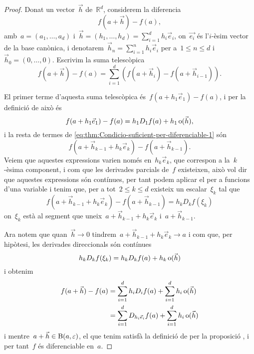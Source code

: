 \documentclass[../calcul-en-diverses-variables.tex]{subfiles}
\begin{document}
    \begin{proof}
        Donat un vector~\(\vec{h}\) de~\(\mathbb{R}^{d}\), considerem la diferencia
        \[
            f(a+\vec{h})-f(a),
        \]
        amb~\(a=(a_{1},\dots,a_{d})\) i~\(\vec{h}=(h_{1},\dots,h_{d})=\sum_{i=1}^{d}h_{i}\vec{e}_{i}\), on~\(\vec{e_{i}}\) és l'\(i\)-èsim vector de la base canònica, i denotarem~\(\vec{h}_{n}=\sum_{i=1}^{n}h_{i}\vec{e}_{i}\) per a~\(1\leq n\leq d\) i~\(\vec{h}_{0}=(0,\dots,0)\).
        Escrivim la suma telescòpica
        \begin{equation}\label{eq:thm:Condicio-suficient-per-diferenciable-1}
        f(a+\vec{h})-f(a)=\sum_{i=1}^{d}\left(f(a+\vec{h}_{i})-f(a+\vec{h}_{i-1})\right).
        \end{equation}

        El primer terme d'aquesta suma telescòpica és~\(f(a+h_{1}\vec{e}_{1})-f(a)\), i per la definició de  això és
        \[
            f(a+h_{1}\vec{e}_{1})-f(a)=h_{1}D_{1}f(a)+h_{1}\operatorname{o}(\vec{h}),
        \]
        i la resta de termes de \eqref{eq:thm:Condicio-suficient-per-diferenciable-1} són
        \[
            f(a+\vec{h}_{k-1}+h_{k}\vec{e}_{k})-f(a+\vec{h}_{k-1}).
        \]
        Veiem que aquestes expressions varien només en~\(h_{k}\vec{e}_{k}\), que correspon a la~\(k\)-èsima component, i com que les derivades parcials de~\(f\) existeixen, això vol dir que aquestes expressions són contínues, per tant podem aplicar el  per a funcions d'una variable i tenim que, per a tot~\(2\leq k\leq d\) existeix un escalar~\(\xi_{k}\) tal que
        \[
            f(a+\vec{h}_{k-1}+h_{k}\vec{e}_{k})-f(a+\vec{h}_{k-1})=h_{k}D_{k}f(\xi_{k})
        \]
        on~\(\xi_{k}\) està al segment que uneix~\(a+\vec{h}_{k-1}+h_{k}\vec{e}_{k}\) i~\(a+\vec{h}_{k-1}\).

        Ara notem que quan~\(\vec{h}\to0\) tindrem~\(a+\vec{h}_{k-1}+h_{k}\vec{e}_{k}\to a\) i com que, per hipòtesi, les derivades direccionals són contínues
        \[
            h_{k}D_{k}f(\xi_{k})=h_{k}D_{k}f(a)+h_{k}\operatorname{o}(\vec{h})
        \]
        i obtenim
        \begin{align*}
        f(a+\vec{h})-f(a)&=\sum_{i=1}^{d}h_{i}D_{i}f(a)+\sum_{i=1}^{d}h_{i}\operatorname{o}(\vec{h})\\
        &=\sum_{i=1}^{d}D_{h_{i}\vec{e}_{i}}f(a)+\sum_{i=1}^{d}h_{i}\operatorname{o}(\vec{h})
        \end{align*}
        i mentre~\(a+\vec{h}\in\operatorname{B}(a,\varepsilon)\), el que tenim satisfà la definició de  per la proposició , i per tant~\(f\) és diferenciable en~\(a\).
    \end{proof}
\end{document}
